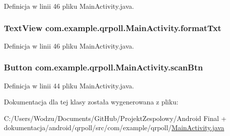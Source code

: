 Definicja w linii 46 pliku Main\+Activity.\+java.

\hypertarget{classcom_1_1example_1_1qrpoll_1_1_main_activity_ac2f96df8bbad653bdd8630d749a23ddc}{
\subsubsection[{format\+Txt}]{\setlength{\rightskip}{0pt plus 5cm}Text\+View com.\+example.\+qrpoll.\+Main\+Activity.\+format\+Txt\hspace{0.3cm}{\ttfamily [private]}}}\label{classcom_1_1example_1_1qrpoll_1_1_main_activity_ac2f96df8bbad653bdd8630d749a23ddc}


Definicja w linii 46 pliku Main\+Activity.\+java.

\hypertarget{classcom_1_1example_1_1qrpoll_1_1_main_activity_a24aa61710d9b421c0d23ab545b4f8b99}{
\subsubsection[{scan\+Btn}]{\setlength{\rightskip}{0pt plus 5cm}Button com.\+example.\+qrpoll.\+Main\+Activity.\+scan\+Btn\hspace{0.3cm}{\ttfamily [private]}}}\label{classcom_1_1example_1_1qrpoll_1_1_main_activity_a24aa61710d9b421c0d23ab545b4f8b99}


Definicja w linii 44 pliku Main\+Activity.\+java.



Dokumentacja dla tej klasy została wygenerowana z pliku\+:\begin{DoxyCompactItemize}
\item 
C\+:/\+Users/\+Wodzu/\+Documents/\+Git\+Hub/\+Projekt\+Zespolowy/\+Android Final + dokumentacja/android/qrpoll/src/com/example/qrpoll/\hyperlink{_main_activity_8java}{Main\+Activity.\+java}\end{DoxyCompactItemize}
